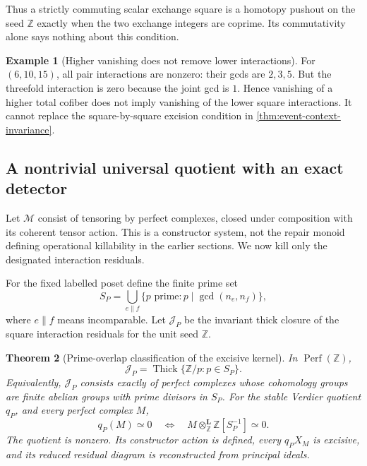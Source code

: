 \documentclass[11pt]{article}
\newtheorem{theorem}{Theorem}[section]
\theoremstyle{definition}
\newtheorem{example}[theorem]{Example}
\theoremstyle{remark}
\begin{document}
Thus a strictly commuting scalar exchange square is a homotopy pushout on the seed $\mathbb Z$ exactly when the two exchange integers are coprime. Its commutativity alone says nothing about this condition.

\begin{example}[Higher vanishing does not remove lower interactions]\label{ex:higher-not-lower}
For $(6,10,15)$, all pair interactions are nonzero: their gcds are $2,3,5$. But the threefold interaction is zero because the joint gcd is $1$. Hence vanishing of a higher total cofiber does not imply vanishing of the lower square interactions. It cannot replace the square-by-square excision condition in \cref{thm:event-context-invariance}.
\end{example}

\subsection{A nontrivial universal quotient with an exact detector}

Let $\mathscr M$ consist of tensoring by perfect complexes, closed under composition with its coherent tensor action. This is a constructor system, not the repair monoid defining operational killability in the earlier sections. We now kill only the designated interaction residuals.

For the fixed labelled poset define the finite prime set
\[
 S_P=\bigcup_{e\parallel f}
 \{p\text{ prime}:p\mid\gcd(n_e,n_f)\},
\]
where $e\parallel f$ means incomparable. Let $\mathcal J_P$ be the invariant thick closure of the square interaction residuals for the unit seed $\mathbb Z$.

\begin{theorem}[Prime-overlap classification of the excisive kernel]\label{thm:prime-overlap-quotient}
In $\operatorname{Perf}(\mathbb Z)$,
\[
 \boxed{\mathcal J_P=
 \operatorname{Thick}\{\mathbb Z/p:p\in S_P\}.}
\]
Equivalently, $\mathcal J_P$ consists exactly of perfect complexes whose cohomology groups are finite abelian groups with prime divisors in $S_P$. For the stable Verdier quotient $q_P$, and every perfect complex $M$,
\[
 q_P(M)\simeq0
 \quad\Longleftrightarrow\quad
 M\otimes^{\mathbf L}_{\mathbb Z}\mathbb Z[S_P^{-1}]\simeq0.
\]
The quotient is nonzero. Its constructor action is defined, every $q_PX_M$ is excisive, and its reduced residual diagram is reconstructed from principal ideals.
\end{theorem}
\end{document}
